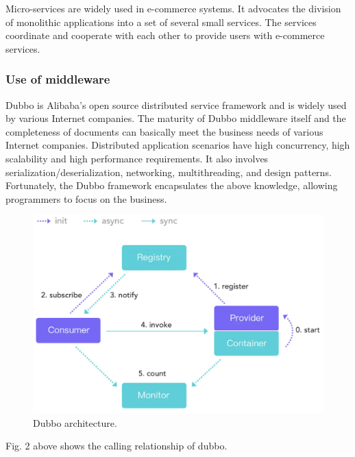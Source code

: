 \documentclass[conference]{IEEEtran}
\begin{document}
Micro-services are widely used in e-commerce systems. It advocates the division of monolithic applications into a set of several small services. The services coordinate and cooperate with each other to provide users with e-commerce services.

\subsubsection{Use of middleware}

Dubbo is Alibaba's open source distributed service framework and is widely used by various Internet companies. The maturity of Dubbo middleware itself and the completeness of documents can basically meet the business needs of various Internet companies. Distributed application scenarios have high concurrency, high scalability and high performance requirements. It also involves serialization/deserialization, networking, multithreading, and design patterns. Fortunately, the Dubbo framework encapsulates the above knowledge, allowing programmers to focus on the business.

\begin{figure}[h]
\centering
\includegraphics[width=1\columnwidth]{dubbo}
\caption{Dubbo architecture.}
\label{fig}
\end{figure}

Fig. 2 above shows the calling relationship of dubbo.
\end{document}
